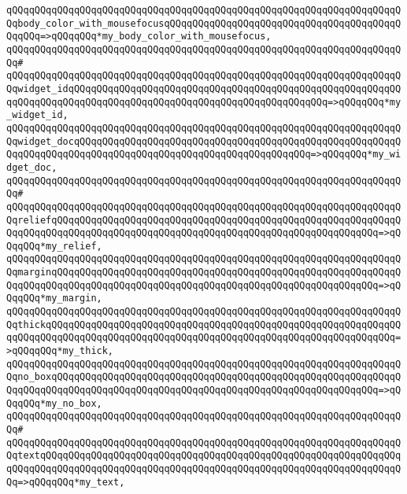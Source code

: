 \verb|qQQqqQQqqQQqqQQqqQQqqQQqqQQqqQQqqQQqqQQqqQQqqQQqqQQqqQQqqQQqqQQqqQQqqQQqbody_color_with_mousefocusqQQqqQQqqQQqqQQqqQQqqQQqqQQqqQQqqQQqqQQqqQQqqQQq=>qQQqqQQq*my_body_color_with_mousefocus,|\newline
\verb|qQQqqQQqqQQqqQQqqQQqqQQqqQQqqQQqqQQqqQQqqQQqqQQqqQQqqQQqqQQqqQQqqQQqqQQq#|\newline
\verb|qQQqqQQqqQQqqQQqqQQqqQQqqQQqqQQqqQQqqQQqqQQqqQQqqQQqqQQqqQQqqQQqqQQqqQQqwidget_idqQQqqQQqqQQqqQQqqQQqqQQqqQQqqQQqqQQqqQQqqQQqqQQqqQQqqQQqqQQqqQQqqQQqqQQqqQQqqQQqqQQqqQQqqQQqqQQqqQQqqQQqqQQqqQQqqQQq=>qQQqqQQq*my_widget_id,|\newline
\verb|qQQqqQQqqQQqqQQqqQQqqQQqqQQqqQQqqQQqqQQqqQQqqQQqqQQqqQQqqQQqqQQqqQQqqQQqwidget_docqQQqqQQqqQQqqQQqqQQqqQQqqQQqqQQqqQQqqQQqqQQqqQQqqQQqqQQqqQQqqQQqqQQqqQQqqQQqqQQqqQQqqQQqqQQqqQQqqQQqqQQqqQQqqQQq=>qQQqqQQq*my_widget_doc,|\newline
\verb|qQQqqQQqqQQqqQQqqQQqqQQqqQQqqQQqqQQqqQQqqQQqqQQqqQQqqQQqqQQqqQQqqQQqqQQq#|\newline
\verb|qQQqqQQqqQQqqQQqqQQqqQQqqQQqqQQqqQQqqQQqqQQqqQQqqQQqqQQqqQQqqQQqqQQqqQQqreliefqQQqqQQqqQQqqQQqqQQqqQQqqQQqqQQqqQQqqQQqqQQqqQQqqQQqqQQqqQQqqQQqqQQqqQQqqQQqqQQqqQQqqQQqqQQqqQQqqQQqqQQqqQQqqQQqqQQqqQQqqQQqqQQq=>qQQqqQQq*my_relief,|\newline
\verb|qQQqqQQqqQQqqQQqqQQqqQQqqQQqqQQqqQQqqQQqqQQqqQQqqQQqqQQqqQQqqQQqqQQqqQQqmarginqQQqqQQqqQQqqQQqqQQqqQQqqQQqqQQqqQQqqQQqqQQqqQQqqQQqqQQqqQQqqQQqqQQqqQQqqQQqqQQqqQQqqQQqqQQqqQQqqQQqqQQqqQQqqQQqqQQqqQQqqQQqqQQq=>qQQqqQQq*my_margin,|\newline
\verb|qQQqqQQqqQQqqQQqqQQqqQQqqQQqqQQqqQQqqQQqqQQqqQQqqQQqqQQqqQQqqQQqqQQqqQQqthickqQQqqQQqqQQqqQQqqQQqqQQqqQQqqQQqqQQqqQQqqQQqqQQqqQQqqQQqqQQqqQQqqQQqqQQqqQQqqQQqqQQqqQQqqQQqqQQqqQQqqQQqqQQqqQQqqQQqqQQqqQQqqQQqqQQq=>qQQqqQQq*my_thick,|\newline
\verb|qQQqqQQqqQQqqQQqqQQqqQQqqQQqqQQqqQQqqQQqqQQqqQQqqQQqqQQqqQQqqQQqqQQqqQQqno_boxqQQqqQQqqQQqqQQqqQQqqQQqqQQqqQQqqQQqqQQqqQQqqQQqqQQqqQQqqQQqqQQqqQQqqQQqqQQqqQQqqQQqqQQqqQQqqQQqqQQqqQQqqQQqqQQqqQQqqQQqqQQqqQQq=>qQQqqQQq*my_no_box,|\newline
\verb|qQQqqQQqqQQqqQQqqQQqqQQqqQQqqQQqqQQqqQQqqQQqqQQqqQQqqQQqqQQqqQQqqQQqqQQq#|\newline
\verb|qQQqqQQqqQQqqQQqqQQqqQQqqQQqqQQqqQQqqQQqqQQqqQQqqQQqqQQqqQQqqQQqqQQqqQQqtextqQQqqQQqqQQqqQQqqQQqqQQqqQQqqQQqqQQqqQQqqQQqqQQqqQQqqQQqqQQqqQQqqQQqqQQqqQQqqQQqqQQqqQQqqQQqqQQqqQQqqQQqqQQqqQQqqQQqqQQqqQQqqQQqqQQqqQQq=>qQQqqQQq*my_text,|\newline
